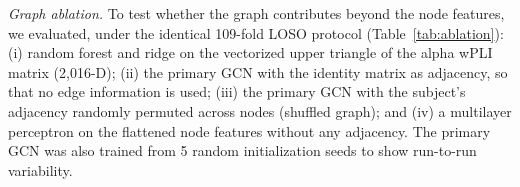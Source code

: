 \documentclass{ieeeaccess}
\begin{document}
\textit{Graph ablation.} To test whether the graph contributes beyond the node features, we evaluated, under the identical 109-fold LOSO protocol (Table~\ref{tab:ablation}): (i) random forest and ridge on the vectorized upper triangle of the alpha wPLI matrix (2,016-D); (ii) the primary GCN with the identity matrix as adjacency, so that no edge information is used; (iii) the primary GCN with the subject's adjacency randomly permuted across nodes (shuffled graph); and (iv) a multilayer perceptron on the flattened node features without any adjacency. The primary GCN was also trained from 5 random initialization seeds to show run-to-run variability.

\begin{table}[!t]
\caption{Graph Ablation Under 109-Fold LOSO (point estimates; seed row: mean $\pm$ SD)}
\label{tab:ablation}
\centering
\scriptsize
{}
\end{table}
\end{document}

